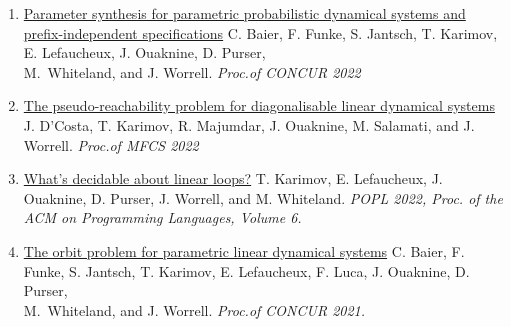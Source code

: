 \documentclass{article}
\begin{document}
\begin{enumerate}
		\item 
            \href{https://drops.dagstuhl.de/opus/volltexte/2022/17073/}{\large Parameter synthesis for parametric probabilistic dynamical systems and \\[0.2cm] prefix-independent specifications}
            \vspace{0.2cm}\newline
            C. Baier, F. Funke, S. Jantsch, T. Karimov, E. Lefaucheux, J. Ouaknine, D. Purser, \\[0.14cm] M.~Whiteland, and J. Worrell. 
		\vspace*{0.2cm}\newline\emph{Proc.\@ of CONCUR 2022}
		\vspace*{0.2cm}

            \newpage
            
		\item 
            \href{https://drops.dagstuhl.de/opus/volltexte/2022/16838/}{\large The pseudo-reachability problem for diagonalisable linear dynamical systems}
            \vspace{0.2cm}\newline
            J. D'Costa, T. Karimov, R. Majumdar, J. Ouaknine, M. Salamati, and J. Worrell. 
		\vspace*{0.2cm}\newline\emph{Proc.\@ of MFCS 2022}
		\vspace*{0.2cm}
  
		\item 
            \href{https://dl.acm.org/doi/10.2145/3498727}{\large What's decidable about linear loops?}
            \vspace{0.2cm}\newline
            T. Karimov, E. Lefaucheux, J. Ouaknine, D. Purser, J. Worrell, and M. Whiteland.
		\vspace*{0.2cm}\newline\emph{POPL 2022, Proc. of the ACM on Programming Languages, Volume 6.}
            \vspace*{0.2cm}
		
		\item 
            \href{https://drops.dagstuhl.de/entities/document/10.4230/LIPIcs.CONCUR.2021.28}{\large The orbit problem for parametric linear dynamical systems}
            \vspace{0.2cm}\newline
            C. Baier, F. Funke, S. Jantsch, T. Karimov, E. Lefaucheux, F. Luca, J. Ouaknine, D. Purser, \\[0.14cm] M.~Whiteland, and J. Worrell.
		\vspace*{0.2cm}\newline \emph{Proc.\@ of CONCUR 2021.}
            \vspace*{0.2cm}
		

\end{enumerate}
\end{document}
